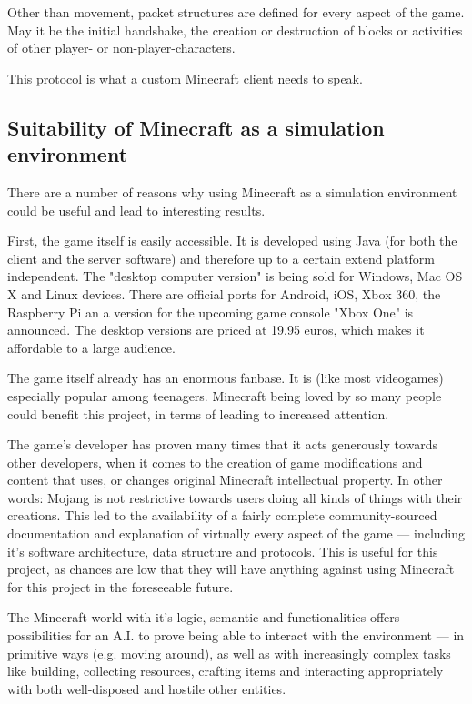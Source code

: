 Other than movement, packet structures are defined for every aspect of the game. May it be the initial handshake, the creation or destruction of blocks or activities of other player- or non-player-characters.

This protocol is what a custom Minecraft client needs to speak.

        \subsection{Suitability of Minecraft as a simulation environment}
There are a number of reasons why using Minecraft as a simulation environment could be useful and lead to interesting results.

First, the game itself is easily accessible. It is developed using Java (for both the client and the server software) and therefore up to a certain extend platform independent. The "desktop computer version" is being sold for Windows, Mac OS X and Linux devices. There are official ports for Android, iOS, Xbox 360, the Raspberry Pi an a version for the upcoming game console "Xbox One" is announced. The desktop versions are priced at 19.95 euros, which makes it affordable to a large audience.

The game itself already has an enormous fanbase. It is (like most videogames) especially popular among teenagers. Minecraft being loved by so many people could benefit this project, in terms of leading to increased attention.

The game's developer has proven many times that it acts generously towards  other developers, when it comes to the creation of game modifications and content that uses, or changes original Minecraft intellectual property. In other words: Mojang is not restrictive towards users doing all kinds of things with their creations. This led to the availability of a fairly complete community-sourced  documentation and explanation of virtually every aspect of the game --- including it's software architecture, data structure and protocols. This is useful for this project, as chances are low that they will have anything against using Minecraft for this project in the foreseeable future. %

The Minecraft world with it's logic, semantic and functionalities offers possibilities for an A.I. to prove being able to interact with the environment --- in primitive ways (e.g. moving around), as well as with increasingly complex tasks like building, collecting resources, crafting items and interacting appropriately with both well-disposed and hostile other entities.

